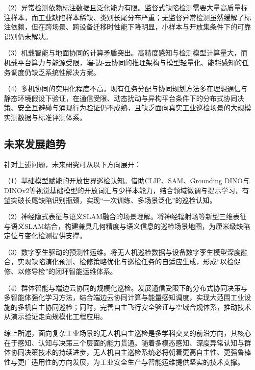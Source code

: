 （2）异常检测依赖标注数据且泛化能力有限。监督式缺陷检测需要大量高质量标注样本，而工业缺陷样本稀缺、类别长尾分布严重\cite{taox2021survey,zhouwq2024review}；无监督异常检测虽然缓解了标注依赖\cite{roth2022towards,batzner2024efficientad}，但在跨场景、跨设备迁移时性能下降明显，小样本与开放集条件下的可靠识别仍未解决\cite{pang2021deep,jeong2023winclip}。

（3）机载智能与地面协同的计算矛盾突出。高精度感知与检测模型计算量大，而机载平台算力与能源受限\cite{howard2017mobilenets,zhou2018computation}，端-边-云协同的推理架构与模型轻量化、能耗感知的任务调度仍缺乏系统性解决方案\cite{zhang2019energy,mozaffari2019tutorial}。

（4）多机协同的实用化程度不高。现有任务分配与协同规划方法多在理想通信与静态环境假设下验证\cite{choi2009consensus,biwh2024review}，在通信受限、动态扰动与异构平台条件下的分布式协同决策、安全互避碰与涌现行为验证仍不成熟\cite{xiangjw2022key,zhou2022swarm}，且缺乏面向真实工业巡检场景的大规模实测数据与标准评测体系。

\subsection{未来发展趋势}

针对上述问题，未来研究可从以下方向展开：

（1）基础模型赋能的开放世界巡检认知。借助CLIP\cite{radford2021learning}、SAM\cite{kirillov2023segment}、Grounding DINO\cite{liu2024grounding}与DINOv2\cite{oquab2024dinov2}等视觉基础模型的开放词汇与少样本能力，结合领域微调与提示学习，有望突破长尾缺陷识别瓶颈，实现“一次训练、多场景泛化”的巡检认知\cite{jeong2023winclip,radford2021learning}。

（2）神经隐式表征与语义SLAM融合的场景理解。将神经辐射场等新型三维表征与语义SLAM\cite{huangzx2023survey,campos2021orb}结合，构建兼具几何精度与语义信息的巡检场景地图，为厘米级缺陷定位与变化检测提供支撑\cite{nex2014uav,liu2020image}。

（3）数字孪生驱动的预测性运维。将无人机巡检数据与设备数字孪生模型深度融合\cite{tao2019digital}，实现缺陷演化预测、检修策略优化与巡检任务的自适应生成，形成“以检促修、以修导检”的闭环智能运维体系。

（4）群体智能与端边云协同的规模化巡检。发展通信受限下的分布式协同决策与多智能体强化学习方法\cite{yu2022surprising,zhou2023racer}，结合端边云协同计算\cite{zhou2018computation}与能量感知调度\cite{zhang2019energy}，实现大范围工业设施的多机自主协同巡检；同时，完善自主飞行安全验证与空域合规体系\cite{stoecker2017review,floreano2015science}，推动技术从演示验证走向规模化工程应用。

综上所述，面向复杂工业场景的无人机自主巡检是多学科交叉的前沿方向，其核心在于感知、认知与决策三个层面的能力贯通。随着多模态感知、深度异常认知与群体协同决策技术的持续进步，无人机自主巡检系统必将朝着更高自主性、更强鲁棒性与更广适用性的方向发展，为工业安全生产与智能运维提供坚实的技术支撑。
